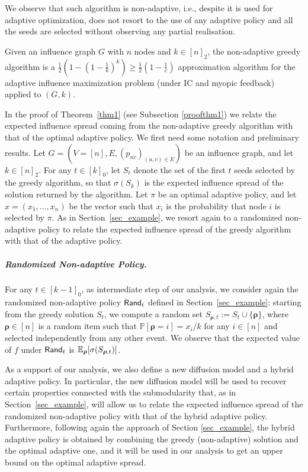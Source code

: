 We observe that such algorithm is non-adaptive, i.e., despite it is used for adaptive optimization, does not resort to the use of any adaptive policy and all the seeds are selected without observing any partial realisation. 
\begin{theorem}\label{thm1}
Given an influence graph $G$ with $n$ nodes and $k\in [n]_2$, the non-adaptive greedy algorithm is a $\frac{1}{2}\left(1-\left(1-\frac{1}{k}\right)^{k}\right)\geq \frac{1}{2}\left(1-\frac{1}{e}\right)$ approximation algorithm for the adaptive influence maximization problem (under IC and myopic feedback) applied to $(G,k)$. 
\end{theorem}
In the proof of Theorem~\ref{thm1} (see Subsection \ref{proofthm1}) we relate the expected influence spread coming from the non-adaptive greedy algorithm with that of the optimal adaptive policy. We first need some notation and preliminary results. Let $G=(V=[n],E,(p_{uv})_{(u,v)\in E})$ be an influence graph, and let $k\in [n]_2$. For any $t\in [k]_0$, let $S_t$ denote the set of the first $t$ seeds selected by the greedy algorithm, so that $\sigma(S_k)$ is the expected influence spread of the solution returned by the algorithm. Let $\pi$ be an optimal adaptive policy, and let $x=(x_1,\ldots, x_n)$ be the vector such that $x_i$ is the probability that node $i$ is selected by $\pi$. As in Section~\ref{sec_example}, we resort again to a randomized non-adaptive policy to relate the expected influence spread of the greedy algorithm with that of the adaptive policy.

\subparagraph*{Randomized Non-adaptive Policy.} For any $t\in [k-1]_0$, as intermediate step of our analysis, we consider again the randomized non-adaptive policy ${\sf Rand}_t$ defined in Section~\ref{sec_example}: starting from the greedy solution $S_{t}$, we compute a random set $S_{\bm\rho,t}:=S_{t}\cup\{\bm \rho\}$, where $\bm\rho\in [n]$ is a random item such that $\mathbb{P}[\bm\rho=i]=x_i/k$ for any $i\in [n]$ and selected independently from any other event. We observe that the expected value of $f$ under ${\sf Rand}_{t}$ is $\mathbb{E}_{\bm \rho}[\sigma(S_{\bm\rho,t})]$. 

As a support of our analysis, we also define a new diffusion model and a hybrid adaptive policy. In particular, the new diffusion model will be used to recover certain properties connected with the submodularity that, as in Section~\ref{sec_example}, will allow us to relate the expected influence spread of the randomized non-adaptive policy with that of the hybrid adaptive policy. Furthermore, following again the approach of Section \ref{sec_example}, the hybrid adaptive policy is obtained by combining the greedy (non-adaptive) solution and the optimal adaptive one, and it will be used in our analysis to get an upper bound on the optimal adaptive spread. 



